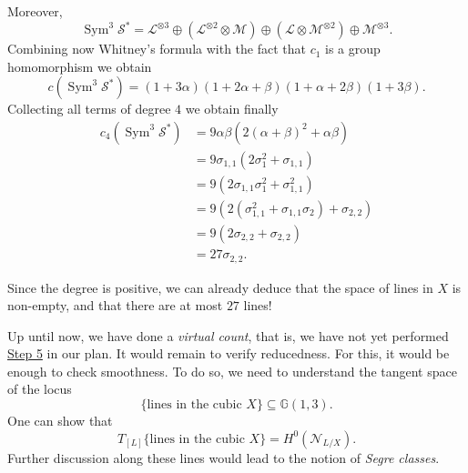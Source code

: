 \documentclass[12pt,a4paper]{amsart}
\theoremstyle{plain}
\theoremstyle{definition}
\theoremstyle{remark}
\begin{document}
Moreover,
\[ \operatorname{Sym}^{3}\mathscr{S}^{*} = \mathscr{L}^{\otimes 3} \oplus (\mathscr{L}^{\otimes 2} \otimes \mathscr{M}) \oplus (\mathscr{L}\otimes \mathscr{M}^{\otimes 2}) \oplus \mathscr{M}^{\otimes 3}. \]
Combining now Whitney's formula with the fact that $c_{1}$ is a group homomorphism we obtain
\[ c(\operatorname{Sym}^{3}\mathscr{S}^{*}) = (1 + 3\alpha)(1 + 2 \alpha + \beta)(1 + \alpha + 2\beta)(1 + 3 \beta). \]
Collecting all terms of degree $4$ we obtain finally
\begin{align*}
  c_{4}(\operatorname{Sym}^{3}\mathscr{S}^{*}) & = 9\alpha\beta(2(\alpha + \beta)^{2} + \alpha\beta) \\
  & = 9 \sigma_{1,1} (2 \sigma_{1}^{2} + \sigma_{1,1}) \\
  & = 9 (2 \sigma_{1,1}\sigma_{1}^{2} + \sigma_{1,1}^{2}) \\
  & = 9 (2 (\sigma_{1,1}^{2} + \sigma_{1,1}\sigma_{2}) + \sigma_{2,2}) \\
  & = 9 (2 \sigma_{2,2} + \sigma_{2,2}) \\
  & = 27 \sigma_{2,2}.
\end{align*}

Since the degree is positive, we can already deduce that the space of lines in $X$ is non-empty, and that there are at most $27$ lines!

Up until now, we have done a \textit{virtual count}, that is, we have not yet performed \underline{Step 5} in our plan.
It would remain to verify reducedness.
For this, it would be enough to check smoothness.
To do so, we need to understand the tangent space of the locus
\[ \{ \text{lines in the cubic } X \} \subseteq \mathbb{G}(1,3). \]
One can show that
\[ T_{[L]}\{ \text{lines in the cubic } X\} = H^{0}(\mathscr{N}_{L/X}). \]
Further discussion along these lines would lead to the notion of \textit{Segre classes}.



\vfill
\end{document}

